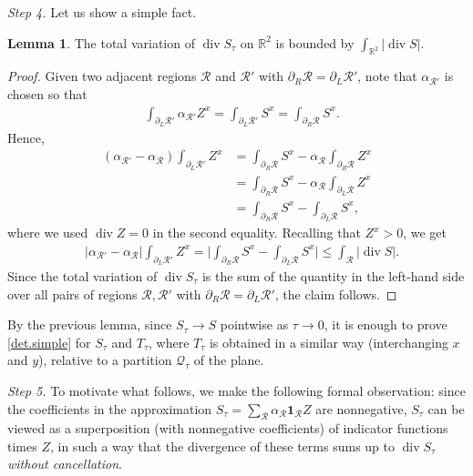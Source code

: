 \documentclass[11pt,a4paper]{amsart}
\newcommand{\R}{\mathbb{R}}
\newcommand{\de}{\partial}
\newcommand{\uno}{\bm{1}}
\theoremstyle{definition}
\newtheorem{lemmaen}[definition]{Lemma}
\DeclareMathOperator{\dive}{div}
\newcommand{\reg}{\mathcal{R}}
\begin{document}
\emph{Step 4.} Let us show a simple fact.

\begin{lemmaen}
	The total variation of $\dive S_\tau$ on $\R^2$ is bounded by $\int_{\R^2}\lvert \dive S\rvert$.
\end{lemmaen}

\begin{proof}
	Given two adjacent regions $\reg$ and $\reg'$ with $\de_R\reg=\de_L\reg'$, note that $\alpha_{\reg'}$ is chosen so that
	\begin{align*}
		&\int_{\de_L\reg'}\alpha_{\reg'}Z^x=\int_{\de_L\reg'}S^x=\int_{\de_R\reg}S^x.
	\end{align*}
	Hence,
	\begin{align*}
		(\alpha_{\reg'}-\alpha_\reg)\int_{\de_L\reg'}Z^x
		&=\int_{\de_R\reg}S^x-\alpha_\reg\int_{\de_R\reg}Z^x \\
		&=\int_{\de_R\reg}S^x-\alpha_{\reg}\int_{\de_L\reg}Z^x \\
		&=\int_{\de_R\reg}S^x-\int_{\de_L\reg}S^x,
	\end{align*}
	where we used $\dive Z=0$ in the second equality. Recalling that $Z^x>0$, we get
	\begin{align*}
		&|\alpha_{\reg'}-\alpha_{\reg}|\int_{\de_L\reg'}Z^x
		=\Big|\int_{\de_R\reg}S^x-\int_{\de_L\reg}S^x\Big|
		\le\int_\reg\lvert \dive S\rvert.
	\end{align*}
	Since the total variation of $\dive S_\tau$ is the sum of the quantity in the left-hand side over all pairs of regions $\reg,\reg'$ with $\de_R\reg=\de_L\reg'$, the claim follows.
\end{proof}

By the previous lemma, since $S_\tau\to S$ pointwise as $\tau\to 0$, it is enough to prove \cref{det.simple} for $S_\tau$ and $T_\tau$, where $T_\tau$ is obtained in a similar way (interchanging $x$ and $y$), relative to a partition $\mathcal{Q}_\tau$ of the plane.


\emph{Step 5.} To motivate what follows, we make the following formal observation: since the coefficients in the approximation $S_\tau=\sum_\reg\alpha_\reg\uno_\reg Z$ are nonnegative, $S_\tau$ can be viewed as a superposition (with nonnegative coefficients) of indicator functions times $Z$, in such a way that the divergence of these terms sums up to $\dive S_\tau$ \emph{without cancellation}.
\end{document}
